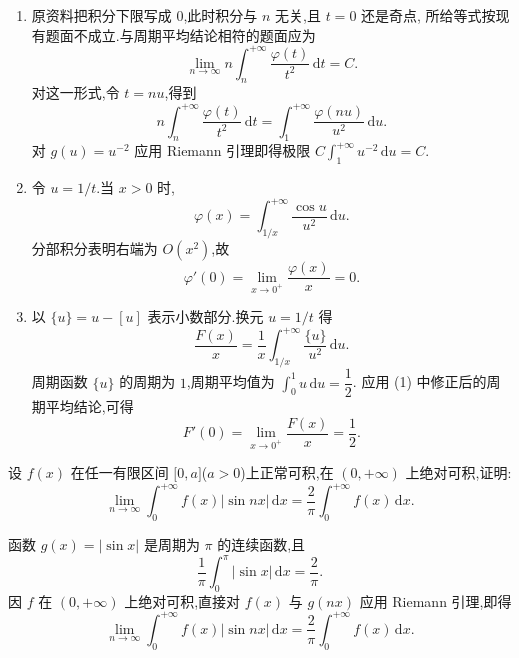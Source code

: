 \begin{solution}
  \begin{enumerate}
    \item 原资料把积分下限写成 $0$,此时积分与 $n$ 无关,且 $t=0$ 还是奇点,
          所给等式按现有题面不成立.与周期平均结论相符的题面应为
          \[
            \lim\limits_{n\to\infty}n\int_n^{+\infty}\dfrac{\varphi(t)}{t^2}\,\mathrm{d}t=C.
          \]
          对这一形式,令 $t=nu$,得到
          \[
            n\int_n^{+\infty}\dfrac{\varphi(t)}{t^2}\,\mathrm{d}t
            =\int_1^{+\infty}\dfrac{\varphi(nu)}{u^2}\,\mathrm{d}u.
          \]
          对 $g(u)=u^{-2}$ 应用 Riemann 引理即得极限
          $C\displaystyle\int_1^{+\infty}u^{-2}\,\mathrm{d}u=C$.

    \item 令 $u=1/t$.当 $x>0$ 时,
          \[
            \varphi(x)=\int_{1/x}^{+\infty}\dfrac{\cos u}{u^2}\,\mathrm{d}u.
          \]
          分部积分表明右端为 $O(x^2)$,故
          \[
            \varphi'(0)=\lim\limits_{x\to0^+}\dfrac{\varphi(x)}{x}=0.
          \]

    \item 以 $\{u\}=u-[u]$ 表示小数部分.换元 $u=1/t$ 得
          \[
            \dfrac{F(x)}{x}
            =\dfrac{1}{x}\int_{1/x}^{+\infty}\dfrac{\{u\}}{u^2}\,\mathrm{d}u.
          \]
          周期函数 $\{u\}$ 的周期为 $1$,周期平均值为
          $\displaystyle\int_0^1u\,\mathrm{d}u=\dfrac{1}{2}$.
          应用 (1) 中修正后的周期平均结论,可得
          \[
            F'(0)=\lim\limits_{x\to0^+}\dfrac{F(x)}{x}=\dfrac{1}{2}.
          \]
  \end{enumerate}
\end{solution}

\begin{example}
  设 $f(x)$ 在任一有限区间 $\lbrack 0,a\rbrack$($a>0$)上正常可积,在 $(0,+\infty)$ 上绝对可积,证明:
  \[
    \lim\limits_{n\to\infty}\int_0^{+\infty}f(x)|\sin nx|\,\mathrm{d}x
    =\dfrac{2}{\pi}\int_0^{+\infty}f(x)\,\mathrm{d}x.
  \]
\end{example}
\exampleblank

\begin{solution}
  函数 $g(x)=|\sin x|$ 是周期为 $\pi$ 的连续函数,且
  \[
    \dfrac{1}{\pi}\int_0^\pi|\sin x|\,\mathrm{d}x=\dfrac{2}{\pi}.
  \]
  因 $f$ 在 $(0,+\infty)$ 上绝对可积,直接对 $f(x)$ 与 $g(nx)$ 应用
  Riemann 引理,即得
  \[
    \lim\limits_{n\to\infty}\int_0^{+\infty}f(x)|\sin nx|\,\mathrm{d}x
    =\dfrac{2}{\pi}\int_0^{+\infty}f(x)\,\mathrm{d}x.
  \]
\end{solution}

